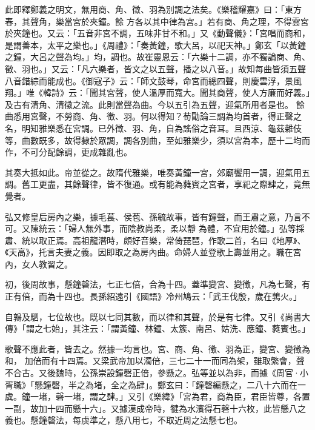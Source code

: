 \begin{pinyinscope}
 此即釋鄭義之明文，無用商、角、徵、羽為別調之法矣。《樂稽耀嘉》曰：「東方春，其聲角，樂當宮於夾鐘。餘
 方各以其中律為宮。」若有商、角之理，不得雲宮於夾鐘也。又云：「五音非宮不調，五味非甘不和。」又《動聲儀》：「宮唱而商和，是謂善本，太平之樂也。」《周禮》：「奏黃鐘，歌大呂，以祀天神。」鄭玄「以黃鐘之鐘，大呂之聲為均。」均，調也。故崔靈恩云：「六樂十二調，亦不獨論商、角、徵、羽也。」又云：「凡六樂者，皆文之以五聲，播之以八音。」故知每曲皆須五聲八音錯綜而能成也。《御寇子》云：「師文鼓琴，命宮而總四聲，則慶雲浮，景風翔。」唯《韓詩》云：「聞其宮聲，使人溫厚而寬大。聞其商聲，使人方廉而好義。」及古有清角、清徵之流。此則當聲為曲。今以五引為五聲，迎氣所用者是也。
 餘曲悉用宮聲，不勞商、角、徵、羽。何以得知？荀勖論三調為均首者，得正聲之名，明知雅樂悉在宮調。已外徵、羽、角，自為謠俗之音耳。且西涼、龜茲雜伎等，曲數既多，故得隸於眾調，調各別曲，至如雅樂少，須以宮為本，歷十二均而作，不可分配餘調，更成雜亂也。



 其奏大抵如此。帝並從之。故隋代雅樂，唯奏黃鐘一宮，郊廟饗用一調，迎氣用五調。舊工更盡，其餘聲律，皆不復通。或有能為蕤賓之宮者，享祀之際肆之，竟無覺者。



 弘又修皇后房內之樂，據毛萇、侯苞、孫毓故事，皆有鐘聲，而王肅之意，乃言不可。又陳統云：「婦人無外事，而陰教尚柔，柔以靜
 為體，不宜用於鐘。」弘等採肅、統以取正焉。高祖龍潛時，頗好音樂，常倚琵琶，作歌二首，名曰《地厚》、《天高》，托言夫妻之義。因即取之為房內曲。命婦人並登歌上壽並用之。職在宮內，女人教習之。



 初，後周故事，懸鐘磬法，七正七倍，合為十四。蓋準變宮、變徵，凡為七聲，有正有倍，而為十四也。長孫紹遠引《國語》冷州鳩云：「武王伐殷，歲在鶉火。」



 自鶉及駟，七位故也。既以七同其數，而以律和其聲，於是有七律。又引《尚書大傳》「謂之七始」，其注云：「謂黃鐘、林鐘、太簇、南呂、姑洗、應鐘、蕤賓也。」



 歌聲不應此者，皆去之。然據一均言也。宮、商、角、徵、羽為正，變宮、變徵為和，
 加倍而有十四焉。又梁武帝加以濁倍，三七二十一而同為架，雖取繁會，聲不合古。又後魏時，公孫崇設鐘磬正倍，參懸之。弘等並以為非，而據《周官·小胥職》「懸鐘磬，半之為堵，全之為肆」。鄭玄曰：「鐘磬編懸之，二八十六而在一虡。鐘一堵，磬一堵，謂之肆。」又引《樂緯》「宮為君，商為臣，君臣皆尊，各置一副，故加十四而懸十六」。又據漢成帝時，犍為水濱得石磬十六枚，此皆懸八之義也。懸鐘磬法，每虡準之，懸八用七，不取近周之法懸七也。




\end{pinyinscope}
